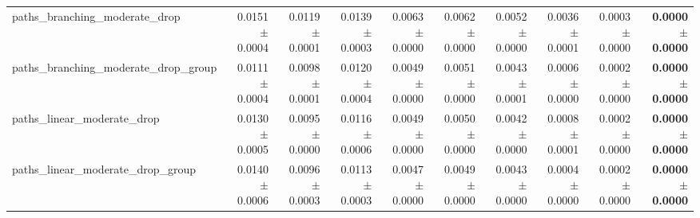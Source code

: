 \begin{tabular}{@{}lrrrrrrrrr@{}}
paths\_branching\_moderate\_drop & 0.0151 $\pm$ 0.0004 & 0.0119 $\pm$ 0.0001 & 0.0139 $\pm$ 0.0003 & 0.0063 $\pm$ 0.0000 & 0.0062 $\pm$ 0.0000 & 0.0052 $\pm$ 0.0000 & 0.0036 $\pm$ 0.0001 & 0.0003 $\pm$ 0.0000 & \textbf{0.0000 $\pm$ 0.0000} \\
paths\_branching\_moderate\_drop\_group & 0.0111 $\pm$ 0.0004 & 0.0098 $\pm$ 0.0001 & 0.0120 $\pm$ 0.0004 & 0.0049 $\pm$ 0.0000 & 0.0051 $\pm$ 0.0000 & 0.0043 $\pm$ 0.0001 & 0.0006 $\pm$ 0.0000 & 0.0002 $\pm$ 0.0000 & \textbf{0.0000 $\pm$ 0.0000} \\
paths\_linear\_moderate\_drop & 0.0130 $\pm$ 0.0005 & 0.0095 $\pm$ 0.0000 & 0.0116 $\pm$ 0.0006 & 0.0049 $\pm$ 0.0000 & 0.0050 $\pm$ 0.0000 & 0.0042 $\pm$ 0.0000 & 0.0008 $\pm$ 0.0001 & 0.0002 $\pm$ 0.0000 & \textbf{0.0000 $\pm$ 0.0000} \\
paths\_linear\_moderate\_drop\_group & 0.0140 $\pm$ 0.0006 & 0.0096 $\pm$ 0.0003 & 0.0113 $\pm$ 0.0003 & 0.0047 $\pm$ 0.0000 & 0.0049 $\pm$ 0.0000 & 0.0043 $\pm$ 0.0000 & 0.0004 $\pm$ 0.0000 & 0.0002 $\pm$ 0.0000 & \textbf{0.0000 $\pm$ 0.0000} \\
\bottomrule
\end{tabular}

